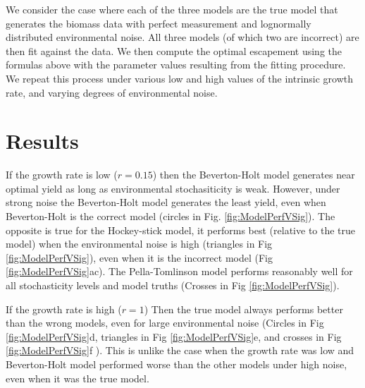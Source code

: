\documentclass[]{elsarticle} %
\begin{document}
We consider the case where each of the three models are the true model that generates the biomass data with perfect measurement and lognormally distributed environmental noise. All three models (of which two are incorrect) are then fit against the data. We then compute the optimal escapement using the formulas above with the parameter values resulting from the fitting procedure. We repeat this process under various low and high values of the intrinsic growth rate, and varying degrees of environmental noise.

\section{Results}

If the growth rate is low ($r=0.15$) then the Beverton-Holt model generates near optimal yield as long as environmental stochasiticity is weak. However, under strong noise the Beverton-Holt model generates the least yield, even when Beverton-Holt is the correct model (circles in Fig. \ref{fig:ModelPerfVSig}). The opposite is true for the Hockey-stick model, it performs best (relative to the true model) when the environmental noise is high (triangles in Fig \ref{fig:ModelPerfVSig}), even when it is the incorrect model (Fig \ref{fig:ModelPerfVSig}ac). The Pella-Tomlinson model performs reasonably well for all stochasticity levels and model truths (Crosses in Fig \ref{fig:ModelPerfVSig}).

If the growth rate is high ($r=1$) Then the true model always performs better than the wrong models, even for large environmental noise (Circles in Fig \ref{fig:ModelPerfVSig}d, triangles in Fig \ref{fig:ModelPerfVSig}e, and crosses in Fig \ref{fig:ModelPerfVSig}f ). This is unlike the case when the growth rate was low and Beverton-Holt model performed worse than the other models under high noise, even when it was the true model. 
\end{document}
